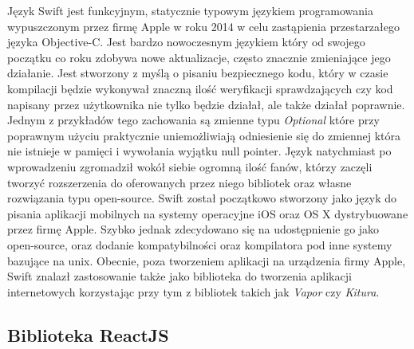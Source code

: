 Język Swift jest funkcyjnym, statycznie typowym językiem programowania wypuszczonym przez firmę Apple w roku 2014 w celu zastąpienia przestarzałego języka Objective-C. Jest bardzo nowoczesnym językiem który od swojego początku co roku zdobywa nowe aktualizacje, często znacznie zmieniające jego działanie. Jest stworzony z myślą o pisaniu bezpiecznego kodu, który w czasie kompilacji będzie wykonywał znaczną ilość weryfikacji sprawdzających czy kod napisany przez użytkownika nie tylko będzie działał, ale także działał poprawnie. Jednym z przykładów tego zachowania są zmienne typu \textit{Optional} które przy poprawnym użyciu praktycznie uniemożliwiają odniesienie się do zmiennej która nie istnieje w pamięci i wywołania wyjątku null pointer. Język natychmiast po wprowadzeniu zgromadził wokół siebie ogromną ilość fanów, którzy zaczęli tworzyć rozszerzenia do oferowanych przez niego bibliotek oraz własne rozwiązania typu open-source.\newline
Swift został początkowo stworzony jako język do pisania aplikacji mobilnych na systemy operacyjne iOS oraz OS X dystrybuowane przez firmę Apple. Szybko jednak zdecydowano się na udostępnienie go jako open-source, oraz dodanie kompatybilności oraz kompilatora pod inne systemy bazujące na unix. Obecnie, poza tworzeniem aplikacji na urządzenia firmy Apple, Swift znalazł zastosowanie także jako biblioteka do tworzenia aplikacji internetowych korzystając przy tym z bibliotek takich jak \textit{Vapor} czy \textit{Kitura}.

\subsection{Biblioteka ReactJS}

